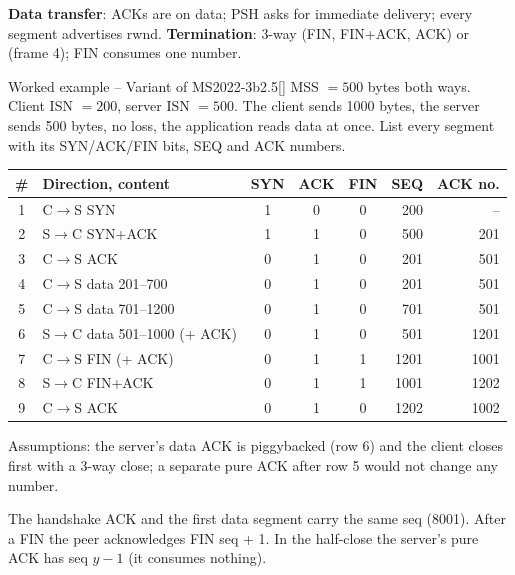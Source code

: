 \textbf{Data transfer}: ACKs are  on data; PSH asks for immediate delivery; every segment advertises rwnd. \textbf{Termination}: 3-way (FIN, FIN+ACK, ACK) or  (frame 4); FIN consumes one number. 



\begin{question}{Worked example -- Variant of MS2022-3b}{2.5}[]
MSS $=500$ bytes both ways. Client ISN $=200$, server ISN $=500$. The client sends 1000 bytes, the server sends 500 bytes, no loss,
the application reads data at once. List every segment with its SYN/ACK/FIN bits, SEQ and ACK numbers.
\end{question}
\begin{solution}
\centering\small
\begin{tabular}{@{}clcccrr@{}}\toprule
\# & Direction, content & SYN & ACK & FIN & SEQ & ACK no.\\\midrule
1 & C$\to$S SYN & 1 & 0 & 0 & 200 & --\\
2 & S$\to$C SYN+ACK & 1 & 1 & 0 & 500 & 201\\
3 & C$\to$S ACK & 0 & 1 & 0 & 201 & 501\\
4 & C$\to$S data 201--700 & 0 & 1 & 0 & 201 & 501\\
5 & C$\to$S data 701--1200 & 0 & 1 & 0 & 701 & 501\\
6 & S$\to$C data 501--1000 (+ ACK) & 0 & 1 & 0 & 501 & 1201\\
7 & C$\to$S FIN (+ ACK) & 0 & 1 & 1 & 1201 & 1001\\
8 & S$\to$C FIN+ACK & 0 & 1 & 1 & 1001 & 1202\\
9 & C$\to$S ACK & 0 & 1 & 0 & 1202 & 1002\\\bottomrule
\end{tabular}\par\raggedright
Assumptions: the server's data ACK is piggybacked (row 6) and the client closes first with a 3-way close; a separate pure ACK after row 5 would not change any number.
\end{solution}

\begin{warningbox}
The handshake ACK and the first data segment carry the same seq (8001). After a FIN the peer acknowledges FIN seq + 1. In the half-close the server's pure ACK has seq $y-1$ (it consumes nothing).
\end{warningbox}

